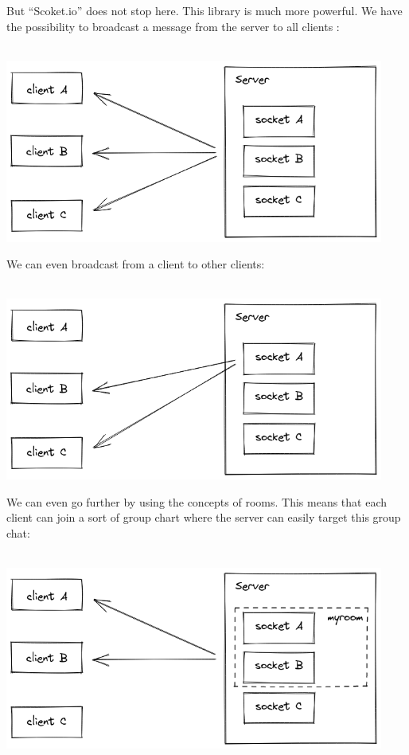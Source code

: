 \documentclass[12pt]{article}
\begin{document}
But “Scoket.io” does not stop here. This library is much more powerful. We have the possibility to broadcast a message from the server to all clients : \\ \\
\centerline{\includegraphics[height=6cm]{../../docs/broadcast-0.png}}

We can even broadcast from a client to other clients: \\ \\
\centerline{\includegraphics[height=6cm]{../../docs/broadcast-1.png}}

We can even go further by using the concepts of rooms. This means that each client can join a sort of group chart where the server can easily target this group chat: \\ \\
\centerline{\includegraphics[height=6cm]{../../docs/rooms.png}}
\end{document}
